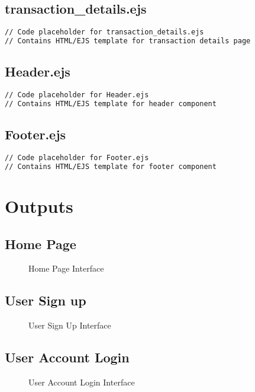 \documentclass[12pt,a4paper]{report}
\begin{document}
\section{transaction\_details.ejs}
\begin{lstlisting}[language=HTML]
// Code placeholder for transaction_details.ejs
// Contains HTML/EJS template for transaction details page
\end{lstlisting}

\section{Header.ejs}
\begin{lstlisting}[language=HTML]
// Code placeholder for Header.ejs
// Contains HTML/EJS template for header component
\end{lstlisting}

\section{Footer.ejs}
\begin{lstlisting}[language=HTML]
// Code placeholder for Footer.ejs
// Contains HTML/EJS template for footer component
\end{lstlisting}

\chapter{Outputs}

\section{Home Page}
\begin{figure}[h]
    \centering
    \caption{Home Page Interface}
\end{figure}

\section{User Sign up}
\begin{figure}[h]
    \centering
    \caption{User Sign Up Interface}
\end{figure}

\section{User Account Login}
\begin{figure}[h]
    \centering
    \caption{User Account Login Interface}
\end{figure}
\end{document}
